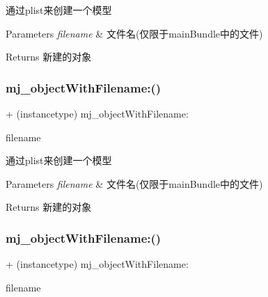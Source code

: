 通过plist来创建一个模型 
\begin{DoxyParams}{Parameters}
{\em filename} & 文件名(仅限于main\+Bundle中的文件) \\
\hline
\end{DoxyParams}
\begin{DoxyReturn}{Returns}
新建的对象 
\end{DoxyReturn}
\mbox{\label{category_n_s_object_07_m_j_key_value_08_a44d9d52cc68ef8c354e28ddc5973aecb}} 
\subsubsection{\texorpdfstring{mj\+\_\+object\+With\+Filename\+:()}{mj\_objectWithFilename:()}\hspace{0.1cm}{\footnotesize\ttfamily [2/3]}}
{\footnotesize\ttfamily + (instancetype) mj\+\_\+object\+With\+Filename\+: \begin{DoxyParamCaption}\item[{(N\+S\+String $\ast$)}]{filename }\end{DoxyParamCaption}}

通过plist来创建一个模型 
\begin{DoxyParams}{Parameters}
{\em filename} & 文件名(仅限于main\+Bundle中的文件) \\
\hline
\end{DoxyParams}
\begin{DoxyReturn}{Returns}
新建的对象 
\end{DoxyReturn}
\mbox{\label{category_n_s_object_07_m_j_key_value_08_a44d9d52cc68ef8c354e28ddc5973aecb}} 
\subsubsection{\texorpdfstring{mj\+\_\+object\+With\+Filename\+:()}{mj\_objectWithFilename:()}\hspace{0.1cm}{\footnotesize\ttfamily [3/3]}}
{\footnotesize\ttfamily + (instancetype) mj\+\_\+object\+With\+Filename\+: \begin{DoxyParamCaption}\item[{(N\+S\+String $\ast$)}]{filename }\end{DoxyParamCaption}}

